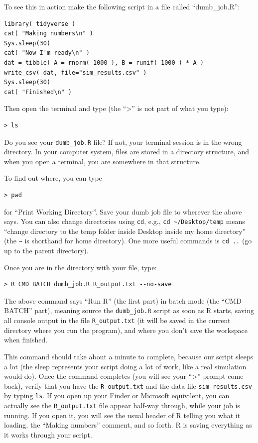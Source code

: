 \documentclass[
]{book}
\begin{document}
To see this in action make the following script in a file called ``dumb\_job.R'':

\begin{verbatim}
library( tidyverse )
cat( "Making numbers\n" )
Sys.sleep(30)
cat( "Now I'm ready\n" )
dat = tibble( A = rnorm( 1000 ), B = runif( 1000 ) * A )
write_csv( dat, file="sim_results.csv" )
Sys.sleep(30)
cat( "Finished\n" )
\end{verbatim}

Then open the terminal and type (the ``\textgreater{}'' is not part of what you type):

\begin{verbatim}
> ls
\end{verbatim}

Do you see your \texttt{dumb\_job.R} file? If not, your terminal session is in the wrong directory.
In your computer system, files are stored in a directory structure, and when you open a terminal, you are somewhere in that structure.

To find out where, you can type

\begin{verbatim}
> pwd
\end{verbatim}

for ``Print Working Directory''.
Save your dumb job file to wherever the above says.
You can also change directories using \texttt{cd}, e.g., \texttt{cd\ \textasciitilde{}/Desktop/temp} means ``change directory to the temp folder inside Desktop inside my home directory'' (the \texttt{\textasciitilde{}} is shorthand for home directory).
One more useful commands is \texttt{cd\ ..} (go up to the parent directory).

Once you are in the directory with your file, type:

\begin{verbatim}
> R CMD BATCH dumb_job.R R_output.txt --no-save
\end{verbatim}

The above command says ``Run R'' (the first part) in batch mode (the ``CMD BATCH'' part), meaning source the \texttt{dumb\_job.R} script as soon as R starts, saving all console output in the file \texttt{R\_output.txt} (it will be saved in the current directory where you run the program), and where you don't save the workspace when finished.

This command should take about a minute to complete, because our script sleeps a lot (the sleep represents your script doing a lot of work, like a real simulation would do).
Once the command completes (you will see your ``\textgreater{}'' prompt come back), verify that you have the \texttt{R\_output.txt} and the data file \texttt{sim\_results.csv} by typing \texttt{ls}.
If you open up your Finder or Microsoft equivilent, you can actually see the \texttt{R\_output.txt} file appear half-way through, while your job is running.
If you open it, you will see the usual header of R telling you what it loading, the ``Making numbers'' comment, and so forth.
R is saving everything as it works through your script.
\end{document}

